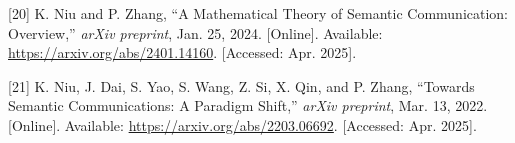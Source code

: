 \documentclass[conference]{IEEEtran}
\begin{document}
{[}20{]} K. Niu and P. Zhang, ``A Mathematical Theory of Semantic
Communication: Overview,'' \emph{arXiv preprint}, Jan. 25, 2024.
{[}Online{]}. Available: \url{https://arxiv.org/abs/2401.14160}.
{[}Accessed: Apr. 2025{]}.

{[}21{]} K. Niu, J. Dai, S. Yao, S. Wang, Z. Si, X. Qin, and P. Zhang,
``Towards Semantic Communications: A Paradigm Shift,'' \emph{arXiv
preprint}, Mar. 13, 2022. {[}Online{]}. Available:
\url{https://arxiv.org/abs/2203.06692}. {[}Accessed: Apr. 2025{]}.


\end{document}
